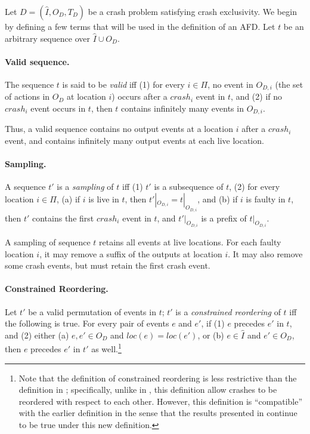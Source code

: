 \documentclass[11pt]{article}
\numberwithin{theorem}{section}
\newcommand{\FD}{D}
\begin{document}
Let $\FD = (\hat{I},O_{\FD},T_{\FD})$ be a crash problem satisfying
crash exclusivity. 
We begin by defining a few terms that will be used in the definition of
an AFD. Let $t$ be an arbitrary sequence over $\hat{I}\cup O_{\FD}$.

\paragraph{Valid sequence.} 
The sequence $t$ is said to be \emph{valid} iff 
(1) for every $i \in \Pi$, no event in $O_{{\FD},i}$ (the set of
actions in $O_{\FD}$ at location $i$) occurs after a $crash_i$ event
in $t$, and 
(2) if no $crash_i$ event occurs in $t$, then $t$ contains infinitely
many events in $O_{{\FD},i}$.

Thus, a valid sequence contains no output events at a location $i$
after a $crash_i$ event, and contains infinitely many output events at
each live location.

\paragraph{Sampling.} 
A sequence $t'$ is a \emph{sampling} of $t$ iff (1) $t'$ is a
subsequence of $t$, (2) for every location $i \in \Pi$, (a) if $i$ is
live in $t$, then $t'|_{O_{{\FD},i}} = t|_{O_{{\FD},i}}$, and (b) if
$i$ is faulty in $t$, then  $t'$ contains the first $crash_i$ event in
$t$, and $t'|_{O_{{\FD},i}}$ is a prefix of $t|_{O_{{\FD},i}}$.

A sampling of sequence $t$ retains all events at live locations.
For each faulty location $i$, it may remove a suffix of the outputs at
location $i$.  It may also remove some crash events, but must retain
the first crash event.

\paragraph{Constrained Reordering.}
Let $t'$ be a valid permutation of events in $t$; $t'$ is a
\emph{constrained reordering} of $t$ iff the following is true. For
every pair of events $e$ and $e'$, if (1) $e$ precedes $e'$ in $t$, and
(2) either (a) $e,e' \in O_D$ and $loc(e) = loc(e')$, or (b) $e \in \hat{I}$ and $e' \in O_D$, then $e$ precedes
$e'$ in $t'$ as well.\footnote{Note that the definition of constrained reordering is less restrictive than the definition in \cite{cornejoetalAFD,cornejoetalAFD-TR}; specifically, unlike in \cite{cornejoetalAFD,cornejoetalAFD-TR}, this definition allow crashes to be reordered with respect to each other. However, this definition is ``compatible'' with the earlier definition in the sense that the results presented in \cite{cornejoetalAFD,cornejoetalAFD-TR} continue to be true under this new definition.}
\end{document}
